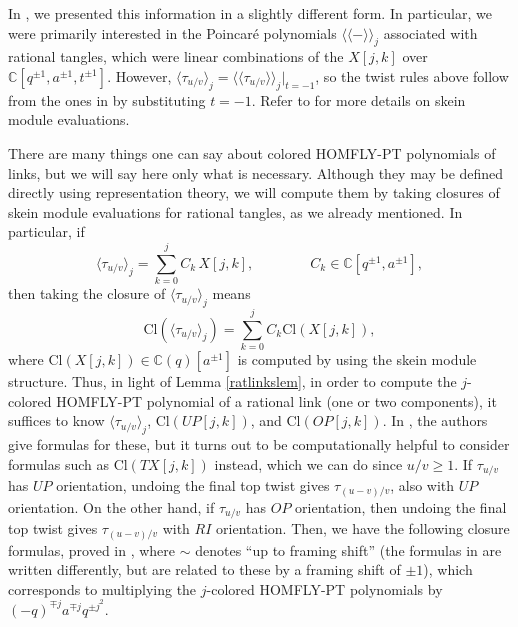 \documentclass[11pt]{amsart}
\theoremstyle{plain}
\theoremstyle{definition}
\theoremstyle{remark}
\begin{document}
In \cite{JHpI26}, we presented this information in a slightly different form. In particular, we were primarily interested in the Poincar\'e polynomials $\langle\langle -\rangle\rangle_j$ associated with rational tangles, which were linear combinations of the $X[j,k]$ over $\mathbb{C}[q^{\pm1},a^{\pm1},t^{\pm1}]$. However, $\langle\tau_{u/v}\rangle_j=\langle\langle\tau_{u/v}\rangle\rangle_j|_{t=-1}$, so the twist rules above follow from the ones in \cite{JHpI26} by substituting $t=-1$. Refer to \cite{JHpI26} for more details on skein module evaluations. 

There are many things one can say about colored HOMFLY-PT polynomials of links, but we will say here only what is necessary. Although they may be defined directly using representation theory, we will compute them by taking closures of skein module evaluations for rational tangles, as we already mentioned. In particular, if
\[
\langle \tau_{u/v}\rangle_j=\sum_{k=0}^j C_k\,X[j,k], \qquad\qquad C_k\in\mathbb{C}[q^{\pm1},a^{\pm1}],
\]
then taking the closure of $\langle \tau_{u/v}\rangle_j$ means
\[
\text{Cl}(\langle\tau_{u/v}\rangle_j) = \sum_{k=0}^j C_k \text{Cl}(X[j,k]),
\]
where $\text{Cl}(X[j,k])\in \mathbb{C}(q)[a^{\pm1}]$ is computed by using the skein module structure. Thus, in light of Lemma \ref{ratlinkslem}, in order to compute the $j$-colored HOMFLY-PT polynomial of a rational link (one or two components), it suffices to know $\langle\tau_{u/v}\rangle_j$, $\text{Cl}(UP[j,k])$, and $\text{Cl}(OP[j,k])$. In \cite{SW21}, the authors give formulas for these, but it turns out to be computationally helpful to consider formulas such as $\text{Cl}(TX[j,k])$ instead, which we can do since $u/v\geq1$. If $\tau_{u/v}$ has $UP$ orientation, undoing the final top twist gives $\tau_{(u-v)/v}$, also with $UP$ orientation. On the other hand, if $\tau_{u/v}$ has $OP$ orientation, then undoing the final top twist gives $\tau_{(u-v)/v}$ with $RI$ orientation. Then, we have the following closure formulas, proved in \cite{SW21}, where $\sim$ denotes ``up to framing shift'' (the formulas in \cite{SW21} are written differently, but are related to these by a framing shift of $\pm 1$), which corresponds to multiplying the $j$-colored HOMFLY-PT polynomials by $(-q)^{\mp j}a^{\mp j}q^{\pm j^2}$.
\end{document}
